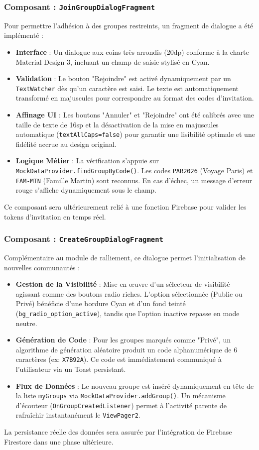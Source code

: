 \documentclass{article}
\begin{document}
\subsubsection{Composant : \texttt{JoinGroupDialogFragment}}
Pour permettre l'adhésion à des groupes restreints, un fragment de dialogue a été implémenté :
\begin{itemize}
    \item \textbf{Interface} : Un dialogue aux coins très arrondis (20dp) conforme à la charte Material Design 3, incluant un champ de saisie stylisé en Cyan.
    \item \textbf{Validation} : Le bouton "Rejoindre" est activé dynamiquement par un \texttt{TextWatcher} dès qu'un caractère est saisi. Le texte est automatiquement transformé en majuscules pour correspondre au format des codes d'invitation.
    \item \textbf{Affinage UI} : Les boutons "Annuler" et "Rejoindre" ont été calibrés avec une taille de texte de 16sp et la désactivation de la mise en majuscules automatique (\texttt{textAllCaps=false}) pour garantir une lisibilité optimale et une fidélité accrue au design original.
    \item \textbf{Logique Métier} : La vérification s'appuie sur \texttt{MockDataProvider.findGroupByCode()}. Les codes \texttt{PAR2026} (Voyage Paris) et \texttt{FAM-MTN} (Famille Martin) sont reconnus. En cas d'échec, un message d'erreur rouge s'affiche dynamiquement sous le champ.
\end{itemize}
Ce composant sera ultérieurement relié à une fonction Firebase pour valider les tokens d'invitation en temps réel.

\subsubsection{Composant : \texttt{CreateGroupDialogFragment}}
Complémentaire au module de ralliement, ce dialogue permet l'initialisation de nouvelles communautés :
\begin{itemize}
    \item \textbf{Gestion de la Visibilité} : Mise en œuvre d'un sélecteur de visibilité agissant comme des boutons radio riches. L'option sélectionnée (Public ou Privé) bénéficie d'une bordure Cyan et d'un fond teinté (\texttt{bg\_radio\_option\_active}), tandis que l'option inactive repasse en mode neutre.
    \item \textbf{Génération de Code} : Pour les groupes marqués comme "Privé", un algorithme de génération aléatoire produit un code alphanumérique de 6 caractères (ex: \texttt{X7B92A}). Ce code est immédiatement communiqué à l'utilisateur via un Toast persistant.
    \item \textbf{Flux de Données} : Le nouveau groupe est inséré dynamiquement en tête de la liste \texttt{myGroups} via \texttt{MockDataProvider.addGroup()}. Un mécanisme d'écouteur (\texttt{OnGroupCreatedListener}) permet à l'activité parente de rafraîchir instantanément le \texttt{ViewPager2}.
\end{itemize}
La persistance réelle des données sera assurée par l'intégration de Firebase Firestore dans une phase ultérieure.
\end{document}
